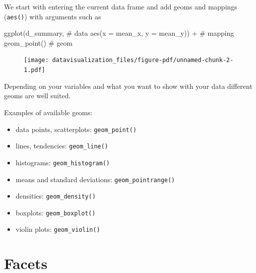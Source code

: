 \documentclass[
  letterpaper,
  DIV=11,
  numbers=noendperiod,
  oneside]{scrreprt}
\newenvironment{Shaded}{\begin{snugshade}}{\end{snugshade}}
\newcommand{\AttributeTok}[1]{\textcolor[rgb]{0.40,0.45,0.13}{#1}}
\newcommand{\CommentTok}[1]{\textcolor[rgb]{0.37,0.37,0.37}{#1}}
\newcommand{\FunctionTok}[1]{\textcolor[rgb]{0.28,0.35,0.67}{#1}}
\newcommand{\NormalTok}[1]{\textcolor[rgb]{0.00,0.23,0.31}{#1}}
\newcommand{\SpecialCharTok}[1]{\textcolor[rgb]{0.37,0.37,0.37}{#1}}
\providecommand{\tightlist}{%
  \setlength{\itemsep}{0pt}\setlength{\parskip}{0pt}}\usepackage{longtable,booktabs,array}
\begin{document}
We start with entering the current data frame and add geoms and mappings
(\texttt{aes()}) with arguments such as

\begin{Shaded}
\begin{Highlighting}[]
\FunctionTok{ggplot}\NormalTok{(d\_summary, }\CommentTok{\# data}
       \FunctionTok{aes}\NormalTok{(}\AttributeTok{x =}\NormalTok{ mean\_x, }\AttributeTok{y =}\NormalTok{ mean\_y)) }\SpecialCharTok{+} \CommentTok{\# mapping}
    \FunctionTok{geom\_point}\NormalTok{() }\CommentTok{\# geom }
\end{Highlighting}
\end{Shaded}

\begin{figure}[H]

{\centering \texttt{[image: datavisualization\_files/figure-pdf/unnamed-chunk-2-1.pdf]}

}

\end{figure}

Depending on your variables and what you want to show with your data
different geoms are well suited.

Examples of available geoms:

\begin{itemize}
\tightlist
\item
  data points, scatterplots: \texttt{geom\_point()}
\item
  lines, tendencies: \texttt{geom\_line()}
\item
  histograms: \texttt{geom\_histogram()}
\item
  means and standard deviations: \texttt{geom\_pointrange()}
\item
  densities: \texttt{geom\_density()}
\item
  boxplots: \texttt{geom\_boxplot()}
\item
  violin plots: \texttt{geom\_violin()}
\end{itemize}


\hypertarget{facets}{%
\section{Facets}\label{facets}}
\end{document}
